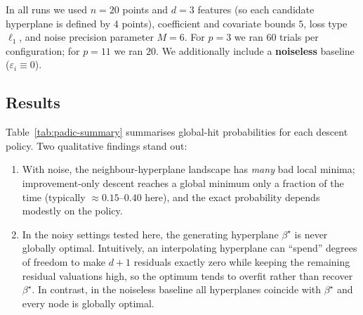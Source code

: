 \documentclass[11pt]{article}
\begin{document}
In all runs we used $n=20$ points and $d=3$ features (so each candidate hyperplane is defined by $4$ points), coefficient and covariate bounds $5$, loss type $\ell_1$, and noise precision parameter $M=6$. For $p=3$ we ran $60$ trials per configuration; for $p=11$ we ran $20$. We additionally include a \textbf{noiseless} baseline ($\varepsilon_i\equiv 0$).

\subsection{Results}
Table~\ref{tab:padic-summary} summarises global-hit probabilities for each descent policy. Two qualitative findings stand out:
\begin{enumerate}
  \item With noise, the neighbour-hyperplane landscape has \emph{many} bad local minima; improvement-only descent reaches a global minimum only a fraction of the time (typically $\approx 0.15$--$0.40$ here), and the exact probability depends modestly on the policy.
  \item In the noisy settings tested here, the generating hyperplane $\beta^\star$ is never globally optimal. Intuitively, an interpolating hyperplane can ``spend'' degrees of freedom to make $d{+}1$ residuals exactly zero while keeping the remaining residual valuations high, so the optimum tends to overfit rather than recover $\beta^\star$. In contrast, in the noiseless baseline all hyperplanes coincide with $\beta^\star$ and every node is globally optimal.
\end{enumerate}
\end{document}
